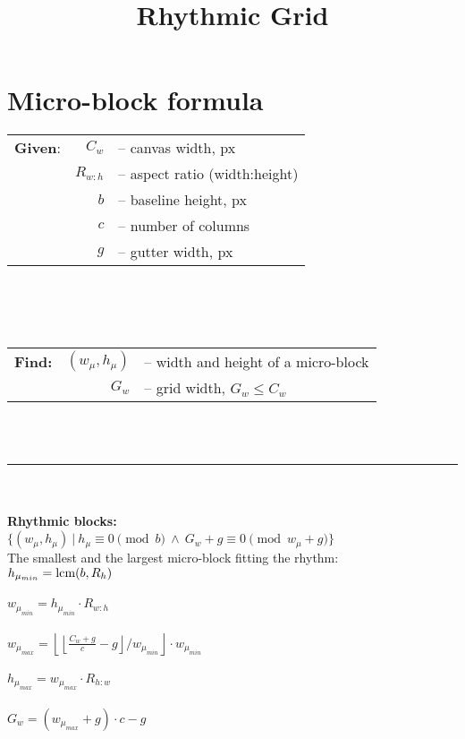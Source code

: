 \documentclass[12pt]{article}
\title{Rhythmic Grid}
\date{}
\begin{document}
\maketitle

\section*{Micro-block formula}
\vspace{1em}
\begin{tabular}{l@{\hskip 2.8em} r l}
\textbf{Given}: & $C_w$ & -- canvas width, px \\
& $R_{w:h}$ & -- aspect ratio (width:height) \\
& $b$ & -- baseline height, px \\ 
& $c$ & -- number of columns \\
& $g$ & -- gutter width, px \\
\end{tabular} \\ \\ \\
\begin{tabular}{l@{\hskip 2em} r l}
\textbf{Find:} & $(w_\mu, h_\mu)$ & -- width and height of a micro-block \\
 & $G_w$ & -- grid width, $G_w \leq C_w$ \\
\end{tabular} \\ \\ 
\noindent\rule{15cm}{0.4pt} \\ \\
\textbf{Rhythmic blocks:} \vspace{.5em} \\
$\{\left( w_{\mu}, h_{\mu} \right) \ | \ h_\mu \equiv 0\pmod{b}  \ \land \  G_w+g \equiv 0\pmod{w_\mu + g}  \}$ \vspace{1em} \\

\noindent The smallest and the largest micro-block fitting the rhythm: \vspace{.5em}\\
$h_{\mu_{min}} = \textup{lcm} (b, R_h)$ \\ \\
$w_{\mu_{min}} = h_{\mu_{min}} \cdot R_{w:h}$ \\ \\
$w_{\mu_{max}} = \left \lfloor \left \lfloor \frac{C_w+g}{c} -g \right \rfloor /  w_{\mu_{min}} \right \rfloor \cdot w_{\mu_{min}}$ \\ \\
$h_{\mu_{max}} = w_{\mu_{max}} \cdot R_{h:w}$ \\ \\
$G_w = (w_{\mu_{max}}+g)\cdot c - g$\\ \\
\end{document}
